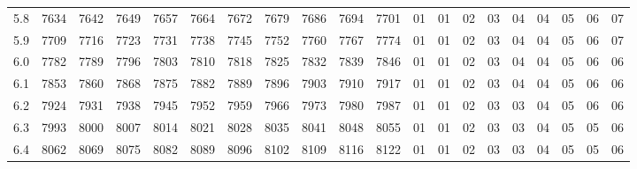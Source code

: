 \documentclass[12pt,UTF8]{ctexbook}
\begin{document}
\begin{appendix}
\begin{longtable}{|c| c c c c c | c c c c c| c c c c c c c c c|}
\scriptsize 5.8 & \scriptsize 7634 & \scriptsize 7642 & \scriptsize 7649 & \scriptsize 7657 & \scriptsize 7664 & \scriptsize 7672 & \scriptsize 7679 & \scriptsize 7686 & \scriptsize 7694 & \scriptsize 7701 & \scriptsize 01 & \scriptsize 01 & \scriptsize 02 & \scriptsize 03 & \scriptsize 04 & \scriptsize 04 & \scriptsize 05 & \scriptsize 06 & \scriptsize 07 \\
\scriptsize 5.9 & \scriptsize 7709 & \scriptsize 7716 & \scriptsize 7723 & \scriptsize 7731 & \scriptsize 7738 & \scriptsize 7745 & \scriptsize 7752 & \scriptsize 7760 & \scriptsize 7767 & \scriptsize 7774 & \scriptsize 01 & \scriptsize 01 & \scriptsize 02 & \scriptsize 03 & \scriptsize 04 & \scriptsize 04 & \scriptsize 05 & \scriptsize 06 & \scriptsize 07 \\
\scriptsize 6.0 & \scriptsize 7782 & \scriptsize 7789 & \scriptsize 7796 & \scriptsize 7803 & \scriptsize 7810 & \scriptsize 7818 & \scriptsize 7825 & \scriptsize 7832 & \scriptsize 7839 & \scriptsize 7846 & \scriptsize 01 & \scriptsize 01 & \scriptsize 02 & \scriptsize 03 & \scriptsize 04 & \scriptsize 04 & \scriptsize 05 & \scriptsize 06 & \scriptsize 06 \\
\scriptsize 6.1 & \scriptsize 7853 & \scriptsize 7860 & \scriptsize 7868 & \scriptsize 7875 & \scriptsize 7882 & \scriptsize 7889 & \scriptsize 7896 & \scriptsize 7903 & \scriptsize 7910 & \scriptsize 7917 & \scriptsize 01 & \scriptsize 01 & \scriptsize 02 & \scriptsize 03 & \scriptsize 04 & \scriptsize 04 & \scriptsize 05 & \scriptsize 06 & \scriptsize 06 \\
\scriptsize 6.2 & \scriptsize 7924 & \scriptsize 7931 & \scriptsize 7938 & \scriptsize 7945 & \scriptsize 7952 & \scriptsize 7959 & \scriptsize 7966 & \scriptsize 7973 & \scriptsize 7980 & \scriptsize 7987 & \scriptsize 01 & \scriptsize 01 & \scriptsize 02 & \scriptsize 03 & \scriptsize 03 & \scriptsize 04 & \scriptsize 05 & \scriptsize 06 & \scriptsize 06 \\
\scriptsize 6.3 & \scriptsize 7993 & \scriptsize 8000 & \scriptsize 8007 & \scriptsize 8014 & \scriptsize 8021 & \scriptsize 8028 & \scriptsize 8035 & \scriptsize 8041 & \scriptsize 8048 & \scriptsize 8055 & \scriptsize 01 & \scriptsize 01 & \scriptsize 02 & \scriptsize 03 & \scriptsize 03 & \scriptsize 04 & \scriptsize 05 & \scriptsize 05 & \scriptsize 06 \\
\scriptsize 6.4 & \scriptsize 8062 & \scriptsize 8069 & \scriptsize 8075 & \scriptsize 8082 & \scriptsize 8089 & \scriptsize 8096 & \scriptsize 8102 & \scriptsize 8109 & \scriptsize 8116 & \scriptsize 8122 & \scriptsize 01 & \scriptsize 01 & \scriptsize 02 & \scriptsize 03 & \scriptsize 03 & \scriptsize 04 & \scriptsize 05 & \scriptsize 05 & \scriptsize 06 \\

\end{longtable}
\end{appendix}
\end{document}
